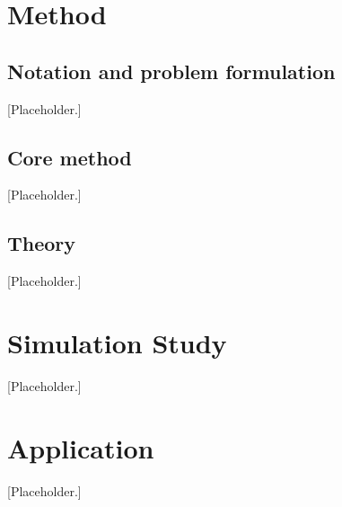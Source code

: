\documentclass[12pt]{article}
\begin{document}
\section{Method}
\label{sec:method}

\subsection{Notation and problem formulation}
\label{sec:notation}
[Placeholder.]

\subsection{Core method}
\label{sec:core-method}
[Placeholder.]

\subsection{Theory}
\label{sec:theory}
[Placeholder.]

\section{Simulation Study}
\label{sec:sims}
[Placeholder.]

\section{Application}
\label{sec:application}
[Placeholder.]
\end{document}
